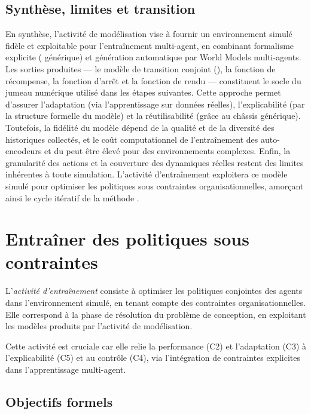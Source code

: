 \section{Synthèse, limites et transition}

\noindent
En synthèse, l’activité de modélisation vise à fournir un environnement simulé fidèle et exploitable pour l’entraînement multi-agent, en combinant formalisme explicite ( générique) et génération automatique par World Models multi-agents. Les sorties produites — le modèle de transition conjoint (), la fonction de récompense, la fonction d’arrêt et la fonction de rendu — constituent le socle du jumeau numérique utilisé dans les étapes suivantes. Cette approche permet d’assurer l’adaptation (via l’apprentissage sur données réelles), l’explicabilité (par la structure formelle du modèle) et la réutilisabilité (grâce au châssis générique). Toutefois, la fidélité du modèle dépend de la qualité et de la diversité des historiques collectés, et le coût computationnel de l’entraînement des auto-encodeurs et du  peut être élevé pour des environnements complexes. Enfin, la granularité des actions et la couverture des dynamiques réelles restent des limites inhérentes à toute simulation. L’activité d’entraînement exploitera ce modèle simulé pour optimiser les politiques sous contraintes organisationnelles, amorçant ainsi le cycle itératif de la méthode .

\clearpage
\thispagestyle{empty}
\null
\newpage

\chapter{Entraîner des politiques sous contraintes}
\label{chap:training}

L'\textit{activité d'entraînement} consiste à optimiser les politiques conjointes des agents dans l’environnement simulé, en tenant compte des contraintes organisationnelles.
Elle correspond à la phase de résolution du problème de conception, en exploitant les modèles produits par l’activité de modélisation.

Cette activité est cruciale car elle relie la performance (C2) et l’adaptation (C3) à l’explicabilité (C5) et au contrôle (C4), via l’intégration de contraintes explicites dans l’apprentissage multi-agent.

\section*{Objectifs formels}

